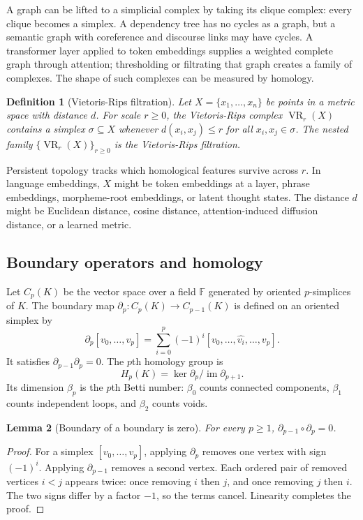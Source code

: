 \documentclass[11pt]{article}
\newtheorem{definition}{Definition}[section]
\newtheorem{lemma}[definition]{Lemma}
\newcommand{\VR}{\operatorname{VR}}
\newcommand{\1}{\mathbf{1}}
\begin{document}
A graph can be lifted to a simplicial complex by taking its clique complex: every clique becomes a simplex. A dependency tree has no cycles as a graph, but a semantic graph with coreference and discourse links may have cycles. A transformer layer applied to token embeddings supplies a weighted complete graph through attention; thresholding or filtrating that graph creates a family of complexes. The shape of such complexes can be measured by homology.

\begin{definition}[Vietoris-Rips filtration]
Let $X=\{x_1,\dots,x_n\}$ be points in a metric space with distance $d$. For scale $r\ge 0$, the Vietoris-Rips complex $\VR_r(X)$ contains a simplex $\sigma\subseteq X$ whenever $d(x_i,x_j)\le r$ for all $x_i,x_j\in\sigma$. The nested family $\{\VR_r(X)\}_{r\ge0}$ is the Vietoris-Rips filtration.
\end{definition}

Persistent topology tracks which homological features survive across $r$. In language embeddings, $X$ might be token embeddings at a layer, phrase embeddings, morpheme-root embeddings, or latent thought states. The distance $d$ might be Euclidean distance, cosine distance, attention-induced diffusion distance, or a learned metric.

\subsection{Boundary operators and homology}

Let $C_p(K)$ be the vector space over a field $\mathbb{F}$ generated by oriented $p$-simplices of $K$. The boundary map $\partial_p:C_p(K)\to C_{p-1}(K)$ is defined on an oriented simplex by
\[
\partial_p[v_0,\ldots,v_p]=\sum_{i=0}^p(-1)^i[v_0,\ldots,\widehat{v_i},\ldots,v_p].
\]
It satisfies $\partial_{p-1}\partial_p=0$. The $p$th homology group is
\[
H_p(K)=\ker \partial_p/\operatorname{im}\partial_{p+1}.
\]
Its dimension $\beta_p$ is the $p$th Betti number: $\beta_0$ counts connected components, $\beta_1$ counts independent loops, and $\beta_2$ counts voids.

\begin{lemma}[Boundary of a boundary is zero]
For every $p\ge 1$, $\partial_{p-1}\circ\partial_p=0$.
\end{lemma}
\begin{proof}
For a simplex $[v_0,\ldots,v_p]$, applying $\partial_p$ removes one vertex with sign $(-1)^i$. Applying $\partial_{p-1}$ removes a second vertex. Each ordered pair of removed vertices $i<j$ appears twice: once removing $i$ then $j$, and once removing $j$ then $i$. The two signs differ by a factor $-1$, so the terms cancel. Linearity completes the proof.
\end{proof}
\end{document}
